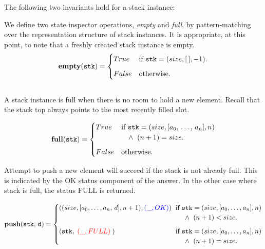 \documentclass[10pt]{article}
\begin{document}
    The following two invariants hold for a stack instance:
    \(
    \)
    

    We define two state inspector operations, \emph{empty} and \emph{full}, by pattern-matching over the representation structure of stack instances. It is appropriate, at this point, to note that a freshly created stack instance is empty.
    \vspace*{3pt}\\
    \[
        \mathtt{\mathbf{empty}(stk)} = \begin{cases} True & \mbox{if  } \mathtt{stk} = (size, [\,], -1). \vspace*{6pt}\\ 
        False & \mbox{otherwise}. \end{cases} 
    \]
    \vspace*{3pt}\\

    A stack instance is full when there is no room to hold a new element. Recall that the stack top always points to the most recently filled slot.

    \[
        \mathtt{\mathbf{full}(stk)} = \begin{cases} True & \mbox{if  } \mathtt{stk} = (size, [a_0, \, \ldots, \, a_n], n) \\
            &\hspace*{10pt}\wedge \; \; (n+1) = size. \vspace*{6pt}\\ 
        False & \mbox{otherwise}. \end{cases} 
    \]
    
    Attempt to push a new element will succeed if the stack is not already full. This is indicated by the OK status component of the answer. In the other case where stack is full, the status FULL is returned.

    \[
        \mathtt{\mathbf{push}(stk,\, d)} = \begin{cases} ((size, [a_0, \dots, a_n, \, d], n+1),  {\textcolor{blue}{(\_, OK)}}) & \hspace*{-4pt}\mbox{if } \mathtt{stk} = (size, [a_0,\dots,a_n], n)\\ & \hspace*{10pt}\wedge\; \; (n+1) < size. \vspace*{6pt}\\ 
        (\mathtt{stk},\;{\textcolor{red}{(\_, FULL)}} \; ) & \hspace*{-4pt}\mbox{if } \mathtt{stk} = (size, [a_0,\dots,a_n], n)\\ %
        & \hspace*{10pt}\wedge\; \; (n+1) = size. \end{cases} 
    \]
\end{document}
